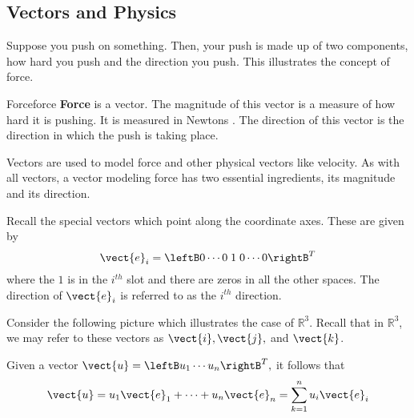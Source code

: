 \subsection{Vectors and Physics}

Suppose you push
on something. Then, your push is made up of two components, how hard you push and the direction you push. This illustrates the concept of force.

\begin{definition}{Force}{force}
\textbf{Force}
 is a vector. The magnitude of this vector is a measure of how
hard it is pushing. It is measured in Newtons . The direction of this vector is the direction in which the push is taking place.
\end{definition}

Vectors are used to model force and other physical vectors like velocity.
 As with all vectors, a vector modeling force has two essential
ingredients, its magnitude and its direction.

Recall the special vectors which point along the coordinate axes.
These are given by 
\begin{equation*}
\vect{e}_{i} = \leftB 0 \cdots 0 \; 1 \; 0 \cdots 0 \rightB^T
\end{equation*}
where the $1$ is in the $i^{th}$ slot and there are zeros in all the other
spaces. The direction of $\vect{e}_{i}$ is referred to as the $i^{th}$ direction.

Consider the following picture which illustrates the case of $\mathbb{R}^{3}.$ 
Recall that in $\mathbb{R}^3$, we may refer to these vectors as $\vect{i}, \vect{j},$ and $\vect{k}$. 

\begin{center}
\end{center}

Given a vector $\vect{u}=\leftB u_{1} \cdots u_{n}\rightB^T ,$ it follows
that
\begin{equation*}
\vect{u}=u_{1}\vect{e}_{1}+\cdots +u_{n}\vect{e}_{n}=
\sum_{k=1}^{n}u_{i}\vect{e}_{i}
\end{equation*}


